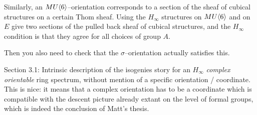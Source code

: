 Similarly, an $MU\langle6\rangle$--orientation corresponds to a section of the sheaf of cubical structures on a certain Thom sheaf.  Using the $H_\infty$ structures on $MU\langle6\rangle$ and on $E$ give two sections of the pulled back sheaf of cubical structures, and the $H_\infty$ condition is that they agree for all choices of group $A$.

Then you also need to check that the $\sigma$--orientation actually satisfies this.


Section 3.1: Intrinsic description of the isogenies story for an $H_\infty$ \emph{complex orientable} ring spectrum, without mention of a specific orientation / coordinate.  This is nice: it means that a complex orientation has to be a coordinate which is compatible with the descent picture already extant on the level of formal groups, which is indeed the conclusion of Matt's thesis.

